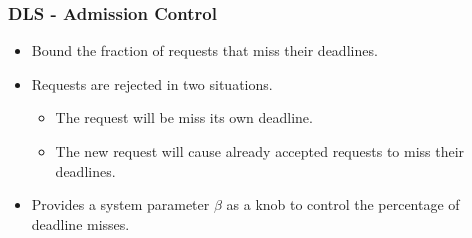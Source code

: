 \documentclass{beamer}
\begin{document}
\begin{frame}
  \frametitle{DLS - Admission Control}
  \begin{itemize}
  \item Bound the fraction of requests that miss their deadlines.
  \item Requests are rejected in two situations.
    \begin{itemize}
    \item The request will be miss its own deadline.
    \item The new request will cause already accepted requests to miss their deadlines.
    \end{itemize}
  \item Provides a system parameter $\beta$ as a knob to control the percentage
    of deadline misses.
  \end{itemize}
\end{frame}


\end{document}
